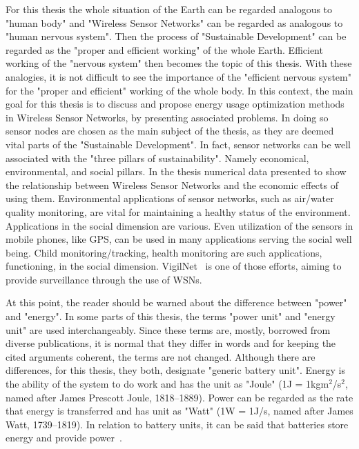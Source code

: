 \documentclass[12pt, oneandhalf, chaparabic, sees, ms]{metu}
\begin{document}
For this thesis the whole situation of the Earth can be regarded
analogous to "human body" and "Wireless Sensor Networks" can be regarded as analogous to "human nervous system". Then the process of "Sustainable Development" 
can be regarded as the "proper and efficient working" of the whole Earth. Efficient working of the "nervous system" then becomes the topic of this thesis. 
With these analogies, it is not difficult to see the importance of the "efficient nervous system" for the "proper and efficient" working of the whole body. 
In this context, the main goal for this thesis is to discuss and propose energy usage optimization methods in Wireless Sensor Networks, by presenting associated problems.
In doing so sensor nodes are chosen as the main subject of the thesis, as they are 
deemed vital parts of the "Sustainable Development". In fact, sensor networks can be well associated with the "three pillars of sustainability". 
Namely economical, environmental, and social pillars.
In the thesis numerical data presented to show the relationship between 
Wireless Sensor Networks and the economic effects of using them. Environmental applications of sensor networks, such as air/water quality monitoring, are vital 
for maintaining a healthy status of the environment. Applications in the social dimension are various. 
Even utilization of the sensors in mobile phones, like GPS, can be used in many applications serving the social well being. 
Child monitoring/tracking, health monitoring are such applications, functioning, in the social dimension. VigilNet~\cite{he2006} is one of those efforts, aiming 
to provide surveillance through the use of WSNs.

At this point, the reader should be warned about the difference between "power" and "energy". 
In some parts of this thesis, the terms "power unit" and "energy unit" are used interchangeably. Since these terms are, mostly, borrowed from diverse publications,
it is normal that they differ in words and for keeping the cited arguments coherent, the terms are not changed. 
Although there are differences, for this thesis, they both, designate "generic battery unit". 
Energy is the ability of the system to do work and has the unit as "Joule" (1J = 1kgm$^2$/s$^2$, named after James Prescott Joule, 1818–1889).
Power can be regarded as the rate that energy is transferred and has unit as "Watt" (1W  = 1J/s, named after James Watt, 1739–1819). 
In relation to battery units, 
it can be said that batteries store energy and provide power~\cite{sterbenz2011}.
\end{document}
